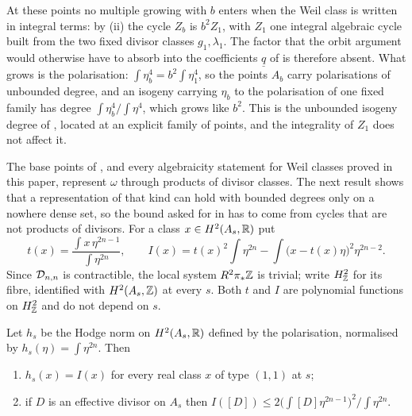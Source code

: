 \begin{remark}\label{rem:quatdivisible}
At these points no multiple growing with $b$ enters when the Weil class is
written in integral terms: by (ii) the cycle $Z_{b}$
is $b^{2}Z_{1}$, with $Z_{1}$ one integral algebraic cycle built from the two
fixed divisor classes $g_{1},\lambda_{1}$. The factor that the orbit argument
would otherwise have to absorb into the coefficients $\underline{q}$ of
 is therefore absent. What grows is the polarisation:
$\int\eta_{b}^{4}=b^{2}\int\eta_{1}^{4}$, so the points $A_{b}$ carry
polarisations of unbounded degree, and an isogeny carrying $\eta_{b}$ to the
polarisation of one fixed family has degree $\int\eta_{b}^{4}/\int\eta^{4}$,
which grows like $b^{2}$. This is the unbounded isogeny degree of
, located at an explicit family of points, and the
integrality of $Z_{1}$ does not affect it.
\end{remark}

The base points of , and every algebraicity statement
for Weil classes proved in this paper, represent $\omega$ through products of
divisor classes. The next result shows that a representation of that kind
can hold with bounded degrees only on a nowhere dense set, so the bound asked
for in  has to come from cycles that are not products of
divisors. For a class $x\in H^{2}(A_{s},\mathbb{R})$ put
\[
  t(x)=\frac{\int x\,\eta^{2n-1}}{\int\eta^{2n}},\qquad
  I(x)=t(x)^{2}\!\int\eta^{2n}-\int\bigl(x-t(x)\eta\bigr)^{2}\eta^{2n-2}.
\]
Since $\mathcal{D}_{n,n}$ is contractible, the local system $R^{2}\pi_{*}\mathbb{Z}$ is
trivial; write $H^{2}_{\mathbb{Z}}$ for its fibre, identified with $H^{2}(A_{s},\mathbb{Z})$
at every $s$. Both $t$ and $I$ are polynomial functions on $H^{2}_{\mathbb{Z}}$ and
do not depend on $s$.

\begin{lemma}\label{lem:nefnorm}
Let $h_{s}$ be the Hodge norm on $H^{2}(A_{s},\mathbb{R})$ defined by the
polarisation, normalised by $h_{s}(\eta)=\int\eta^{2n}$. Then
\begin{enumerate}[label=\textup{(\roman*)},nosep]
\item $h_{s}(x)=I(x)$ for every real class $x$ of type $(1,1)$ at $s$;
\item if $D$ is an effective divisor on $A_{s}$ then
  $I([D])\le 2\bigl(\int[D]\eta^{2n-1}\bigr)^{2}\big/\!\int\eta^{2n}$.
\end{enumerate}
\end{lemma}

